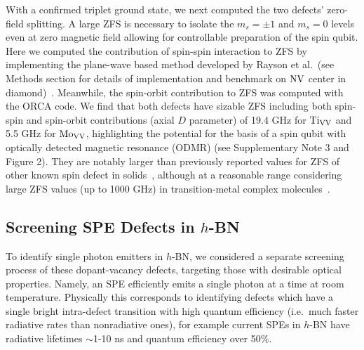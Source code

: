 With a confirmed triplet ground state, we next computed the two defects' zero-field splitting. A large ZFS is necessary to isolate the $m_s = \pm 1$ and $m_s = 0$  levels even at zero magnetic field allowing for controllable preparation of the spin qubit.
Here we computed the contribution of spin-spin interaction to ZFS by implementing the plane-wave based method developed by Rayson et al.\ (see Methods section for details of implementation and benchmark on $\text{NV}$ center in diamond)~\cite{rayson2008first}. Meanwhile, the spin-orbit contribution to ZFS was computed with the ORCA code.
We find that both defects have sizable ZFS including both spin-spin and spin-orbit contributions (axial $D$ parameter) of 19.4 GHz for $\text{Ti}_{\text{V}\text{V}}$ and 5.5 GHz for $\text{Mo}_{\text{V}\text{V}}$, highlighting the potential for the basis of a spin qubit with optically detected magnetic resonance (ODMR) (see Supplementary Note 3 and Figure 2).
They are notably larger than previously reported values for ZFS of other known spin defect in solids~\cite{seo2017designing}, although at a reasonable range considering large ZFS values (up to 1000 GHz) in transition-metal complex molecules~\cite{zolnhofer2020electronic}.

\subsection{Screening SPE Defects in $h$-BN}
To identify single photon emitters in $h$-BN, we considered a separate screening process of these dopant-vacancy defects, targeting those with desirable optical properties. Namely, an SPE efficiently emits a single photon at a time at room temperature.
Physically this corresponds to identifying defects which have a single bright intra-defect transition with high quantum efficiency (i.e.\ much faster radiative rates than nonradiative ones), for example current SPEs in $h$-BN have radiative lifetimes $\sim$1-10 ns and quantum efficiency over 50$\%$.~\cite{tran2016robust,schell2017coupling}

